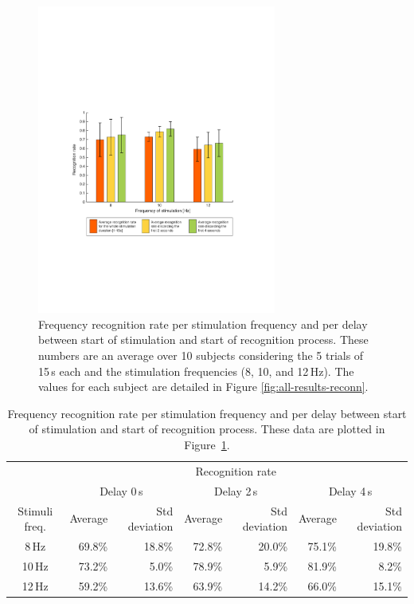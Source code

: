 \documentclass[smallextended]{svjour3}
\begin{document}
\begin{figure}
\center
\includegraphics[width=0.7\textwidth]{figures/taux-reconn.pdf}
\caption{Frequency recognition rate per stimulation frequency and per delay between start of stimulation and start of recognition process. These numbers are an average over 10 subjects considering the 5 trials of 15\,s each and the stimulation frequencies (8, 10, and 12\,Hz). The values for each subject are detailed in Figure \ref{fig:all-results-reconn}.}
\label{fig:taux-reconn}
\end{figure}

\begin{table}\begin{center}
    \begin{tabular}{ c | r | r | r | r | r | r |}
        & \multicolumn{6}{c|}{Recognition rate} \\ 
        & \multicolumn{2}{c|}{Delay 0\,s} & \multicolumn{2}{c|}{Delay 2\,s} & \multicolumn{2}{c|}{Delay 4\,s} \\ 
        Stimuli freq.& Average & Std deviation & Average & Std deviation & Average & Std deviation \\ \hline

         8\,Hz & 69.8\% & 18.8\% & 72.8\% & 20.0\% & 75.1\% & 19.8\% \\
        10\,Hz & 73.2\% &  5.0\% & 78.9\% & 5.9\% & 81.9\% & 8.2\% \\
        12\,Hz & 59.2\% & 13.6\% & 63.9\% & 14.2\% & 66.0\% & 15.1\% \\ \hline
    \end{tabular}
    \caption{Frequency recognition rate per stimulation frequency and per delay between start of stimulation and start of recognition process. These data are plotted in Figure~\ref{fig:taux-reconn}.}
\end{center}\end{table}
\end{document}
